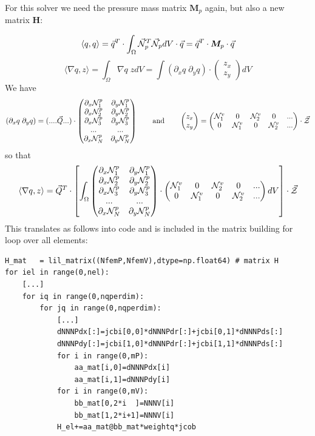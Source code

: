 For this solver we need the pressure mass matrix ${\bm M}_p$ again, but also a new
matrix ${\bm H}$:

\[
\langle q,q \rangle 
= \vec{q}^T \cdot \int_\Omega \vec{\cal N}_p^T \vec{\cal N}_p dV \cdot \vec{q} = \vec{q}^T \cdot {\bm M}_p \cdot \vec{q}
\]
\[
\langle \nabla q,z\rangle = \int_\Omega  \nabla q \; z dV = 
\int (\partial_x q \; \partial_y q) \cdot 
\begin{pmatrix}
z_x \\ z_y
\end{pmatrix}
dV
\]
We have 
\[
(\partial_x q \; \partial_y q) =
(.... \vec{Q} ... ) \cdot
\begin{pmatrix}
\partial_x {\mathcal{N}}_1^p & \partial_y {\mathcal{N}}_1^ p\\
\partial_x {\mathcal{N}}_2^p & \partial_y {\mathcal{N}}_2^ p\\
\partial_x {\mathcal{N}}_3^p & \partial_y {\mathcal{N}}_3^ p\\
...  & ... \\
\partial_x {\mathcal{N}}_N^p & \partial_y {\mathcal{N}}_N^ p
\end{pmatrix}
\qquad
\text{and}
\qquad
\begin{pmatrix}
z_x \\ z_y
\end{pmatrix}
=
\begin{pmatrix}
{\mathcal{N}}_1^v & 0 & {\mathcal{N}}_2^v & 0 & ... \\
0 & {\mathcal{N}}_1^v & 0 & {\mathcal{N}}_2^v & ... \\
\end{pmatrix}
\cdot
\vec{\cal Z}
\]
so that 
\[
\langle \nabla q,z\rangle
= 
\vec{Q}^T \cdot 
\left[
\int_\Omega
\begin{pmatrix}
\partial_x {\mathcal{N}}_1^p & \partial_y {\mathcal{N}}_1^ p\\
\partial_x {\mathcal{N}}_2^p & \partial_y {\mathcal{N}}_2^ p\\
\partial_x {\mathcal{N}}_3^p & \partial_y {\mathcal{N}}_3^ p\\
...  & ... \\
\partial_x {\mathcal{N}}_N^p & \partial_y {\mathcal{N}}_N^ p
\end{pmatrix}
\cdot
\begin{pmatrix}
{\mathcal{N}}_1^v & 0 & {\mathcal{N}}_2^v & 0 & ... \\
0 & {\mathcal{N}}_1^v & 0 & {\mathcal{N}}_2^v & ... \\
\end{pmatrix}
dV \right]
\cdot
\vec{\cal Z}
\]
This translates as follows into code and is included in the 
matrix building for loop over all elements:

\begin{lstlisting}
H_mat   = lil_matrix((NfemP,NfemV),dtype=np.float64) # matrix H 
for iel in range(0,nel):
    [...]
    for iq in range(0,nqperdim):
        for jq in range(0,nqperdim):
            [...]
            dNNNPdx[:]=jcbi[0,0]*dNNNPdr[:]+jcbi[0,1]*dNNNPds[:]
            dNNNPdy[:]=jcbi[1,0]*dNNNPdr[:]+jcbi[1,1]*dNNNPds[:]
            for i in range(0,mP):
                aa_mat[i,0]=dNNNPdx[i]
                aa_mat[i,1]=dNNNPdy[i]
            for i in range(0,mV):
                bb_mat[0,2*i  ]=NNNV[i] 
                bb_mat[1,2*i+1]=NNNV[i] 
            H_el+=aa_mat@bb_mat*weightq*jcob
\end{lstlisting}

